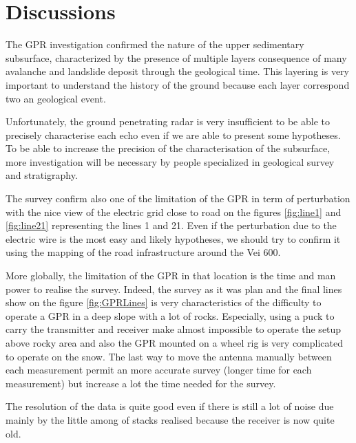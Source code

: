 \newpage
\section{Discussions}

The GPR investigation confirmed the nature of the upper sedimentary subsurface, characterized by the presence of multiple layers consequence of many avalanche and landslide deposit through the geological time. This layering is very important to understand the history of the ground because each layer correspond two an geological event.

Unfortunately, the ground penetrating radar is very insufficient to be able to precisely characterise each echo even if we are able to present some hypotheses. To be able to increase the precision of the characterisation of the subsurface, more investigation will be necessary by people specialized in geological survey and stratigraphy.

The survey confirm also one of the limitation of the GPR in term of perturbation with the nice view of the electric grid close to road on the figures \ref{fig:line1} and \ref{fig:line21} representing the lines 1 and 21. Even if the perturbation due to the electric wire is the most easy and likely hypotheses, we should try to confirm it using the mapping of the road infrastructure around the Vei 600.

More globally, the limitation of the GPR in that location is the time and man power to realise the survey. Indeed, the survey as it was plan and the final lines show on the figure \ref{fig:GPRLines} is very characteristics of the difficulty to operate a GPR in a deep slope with a lot of rocks. Especially, using a puck to carry the transmitter and receiver make almost impossible to operate the setup above rocky area and also the GPR mounted on a wheel rig is very complicated to operate on the snow. The last way to move the antenna manually between each measurement permit an more accurate survey (longer time for each measurement) but increase a lot the time needed for the survey.

The resolution of the data is quite good even if there is still a lot of noise due mainly by the little among of stacks realised because the receiver is now quite old.